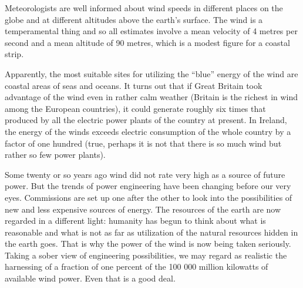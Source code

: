 Meteorologists are well informed about wind speeds in different places on the globe and at different alti­tudes above the earth's surface. The wind is a temperamental thing and so all estimates involve a mean velocity of 4 metres per second and a mean altitude of 90 metres, which is a modest figure for a coastal strip.

Apparently, the most suitable sites for utilizing the ``blue'' energy of the wind are coastal areas of seas and oceans. It turns out that if Great Britain took advantage of the wind even in rather calm weather (Britain is the richest in wind among the European countries), it could generate roughly six times that produced by all the elec­tric power plants of the country at present. In Ireland, the energy of the winds exceeds electric consumption of the whole country by a factor of one hundred (true, perhaps it is not that there is so much wind but rather so few power plants).

Some twenty or so years ago wind did not rate very high as a source of future power. But the trends of power engineering have been changing before our very eyes. Commissions are set up one after the other to look into the possibilities of new and less expensive sources of energy. The resources of the earth are now regarded in a different light: humanity has begun to think about what is reasonable and what is not as far as utilization of the natural resources hidden in the earth goes. That is why the power of the wind is now being taken seriously. Taking a sober view of engineering possibilities, we may regard as real­istic the harnessing of a fraction of one percent of the 100 000 million kilowatts of available wind power. Even that is a good deal.

